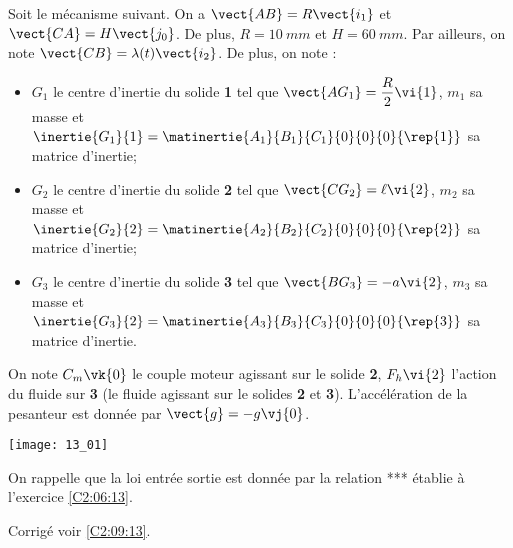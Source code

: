 \normaltrue \difficilefalse \tdifficilefalse
\correctionfalse


\setcounter{question}{0}

\ifcorrection
\else
{}
\fi

\ifprof
\else
Soit le mécanisme suivant. On a $\vect{AB}=R\vect{i_1}$ et $\vect{CA}=H\vect{j_0}$. De plus, 
$R=\SI{10}{mm}$ et $H=\SI{60}{mm}$. Par ailleurs, on note $\vect{CB}=\lambda(t) \vect{i_2}$.
De plus, on note :
\begin{itemize}
\item $G_1$ le centre d'inertie du solide \textbf{1} tel que $\vect{AG_1}=\dfrac{R}{2} \vi{1}$, $m_1$ sa masse et $\inertie{G_1}{1}=\matinertie{A_1}{B_1}{C_1}{0}{0}{0}{\rep{1}}$ sa matrice d'inertie;
\item $G_2$ le centre d'inertie du solide \textbf{2} tel que $\vect{CG_2}=\ell \vi{2}$, $m_2$ sa masse et $\inertie{G_2}{2}=\matinertie{A_2}{B_2}{C_2}{0}{0}{0}{\rep{2}}$ sa matrice d'inertie;
\item $G_3$ le centre d'inertie du solide \textbf{3} tel que $\vect{BG_3}=-a \vi{2}$, $m_3$ sa masse et $\inertie{G_3}{2}=\matinertie{A_3}{B_3}{C_3}{0}{0}{0}{\rep{3}}$ sa matrice d'inertie.
\end{itemize}
On note $C_m\vk{0}$ le couple moteur agissant sur le solide \textbf{2}, $F_h\vi{2}$ l'action du fluide sur \textbf{3} (le fluide agissant sur le solides  \textbf{2} et \textbf{3}). L'accélération de la pesanteur est donnée par $\vect{g}=-g\vj{0}$.

\begin{center}
\texttt{[image: 13\_01]}
\end{center}
\fi

On rappelle que la loi entrée sortie est donnée par la relation *** établie à l'exercice \ref{C2:06:13}.

\ifprof
\else
\fi

\ifprof
\else
\fi

\ifprof
\else
\fi

\ifprof
\else
\fi

\ifprof
\else
\fi


\ifprof
\else
\begin{flushright}
\footnotesize{Corrigé  voir \ref{C2:09:13}.}
\end{flushright}%
\fi